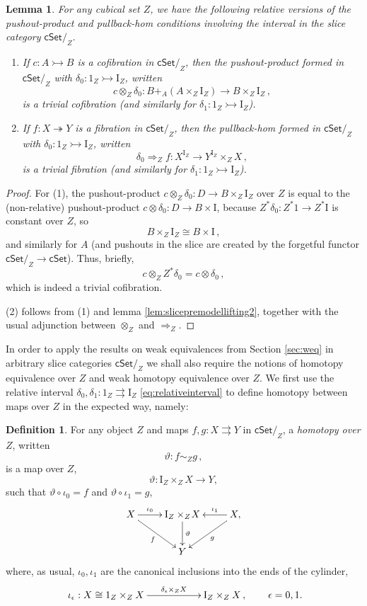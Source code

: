 \documentclass[11pt,reqno]{amsart}
\newcommand{\cSet}{\ensuremath{\mathsf{cSet}}}
\newcommand{\cSetZ}{\ensuremath{\mathsf{cSet}/_{\!Z}}}
\newcommand{\cof}{\ensuremath{\rightarrowtail}}
\newcommand{\fib}{\ensuremath{\twoheadrightarrow}}
\renewcommand{\to}{\ensuremath{\rightarrow}}
\newcommand{\too}{\ensuremath{\longrightarrow}}
\newcommand{\I}{\ensuremath{\mathrm{I}}}
\newtheorem{lemma}[theorem]{Lemma}
\theoremstyle{remark}
\theoremstyle{definition}
\newtheorem{definition}[theorem]{Definition}
\begin{document}
\begin{lemma}\label{lemma:JTslice}
For any cubical set $Z$, we have the following relative versions of the pushout-product and pullback-hom conditions involving the interval in the slice category $\cSetZ$.
\begin{enumerate}
\item If $c : A \cof B$ is a cofibration in $\cSetZ$, then the pushout-product formed in $\cSetZ$ with $\delta_0 : 1_Z \cof \I_Z$, written
\[
c\otimes_Z \delta_0 : B +_{A} (A\times_Z \I_Z) \too B\times_Z \I_Z\,,
\]
is a trivial cofibration (and similarly for $\delta_1 : 1_Z\cof \I_Z$). 
\item If $f : X \fib Y$ is a fibration in $\cSetZ$, then the pullback-hom formed in $\cSetZ$ with $\delta_0 : 1_Z \cof \I_Z$, written
\[
\delta_0\Rightarrow_Z f : X^{\I_Z} \too Y^{\I_Z}\times_Z X \,,
\]
is a trivial fibration (and similarly for $\delta_1 : 1_Z\cof \I_Z$). 
\end{enumerate}
\end{lemma}

\begin{proof}
For (1),  the pushout-product $c \otimes_Z \delta_0 : D \to B \times_Z \I_Z$ over $Z$ is equal to the (non-relative) pushout-product $c \otimes \delta_0 : D \to B \times \I$, because $Z^*\delta_0 : Z^*1 \to Z^*\I$  is constant over $Z$, so
\[
B\times_Z \I_Z \cong B \times \I\,,
\]  
and similarly for $A$ (and pushouts in the slice are created by the forgetful functor $\cSetZ \to \cSet$).  Thus, briefly,
\[
c \otimes_Z Z^*\delta_0 = c \otimes \delta_0 \,,
\]
which is indeed a trivial cofibration.

(2) follows from (1) and lemma \ref{lem:slicepremodellifting2}, together with the usual adjunction between $\otimes_Z$ and $\Rightarrow_Z$.
\end{proof}

In order to apply the results on weak equivalences from Section \ref{sec:weq} in arbitrary slice categories $\cSetZ$ we shall also require  the notions of homotopy equivalence over $Z$ and weak homotopy equivalence over $Z$.  We first use the relative interval $\delta_0, \delta_1 : 1_Z \rightrightarrows \I_Z$ \eqref{eq:relativeinterval} to define homotopy between maps over $Z$ in the expected way, namely:

\begin{definition}\label{homotopyinaslice}
For any object $Z$ and maps $f, g: X\rightrightarrows Y$ in $\cSetZ$, a \emph{homotopy over $Z$}, written 
\[
\vartheta : f \sim_Z g\,,
\]
 is a map over $Z$,
\[
\vartheta : \I_Z\times_Z {X} \too Y,
\]
such that $\vartheta \circ \iota_0 = f$ and $\vartheta \circ \iota_1 = g$, 
\begin{equation}\label{diagram:defhomotopy2}
\xymatrix{
X \ar[r]^-{\iota_0} \ar[rd]_f & \I_Z\times_Z\!{X} \ar[d]^-{\vartheta} & X, \ar[l]_-{\iota_1} \ar[ld]^g \\
& Y &
}
\end{equation}
where, as usual, $\iota_0, \iota_1$ are the canonical inclusions into the ends of the cylinder,
\[
\xymatrix{
\iota_\epsilon : X \cong 1_Z\times_Z X \ar[rr]^-{\delta_\epsilon\times_Z X} && \I_Z\times_Z X\,,} \qquad \epsilon = 0,1 .
\]
\end{definition}
\end{document}
